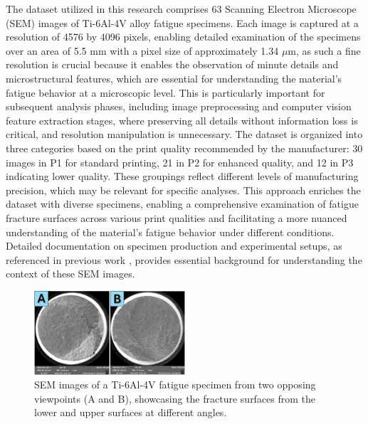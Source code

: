 \documentclass{ieeeaccess}
\begin{document}
The dataset utilized in this research comprises 63 Scanning Electron Microscope (SEM) images of Ti-6Al-4V alloy fatigue specimens. Each image is captured at a resolution of 4576 by 4096 pixels, enabling detailed examination of the specimens over an area of 5.5 mm with a pixel size of approximately 1.34 $\mu$m, as such a fine resolution is crucial because it enables the observation of minute details and microstructural features, which are essential for understanding the material’s fatigue behavior at a microscopic level.
This is particularly important for subsequent analysis phases, including image preprocessing and computer vision feature extraction stages, where preserving all details without information loss is critical, and resolution manipulation is unnecessary.
The dataset is organized into three categories based on the print quality recommended by the manufacturer: 30 images in P1 for standard printing, 21 in P2 for enhanced quality, and 12 in P3 indicating lower quality. These groupings reflect different levels of manufacturing precision, which may be relevant for specific analyses.
This approach enriches the dataset with diverse specimens, enabling a comprehensive examination of fatigue fracture surfaces across various print qualities and facilitating a more nuanced understanding of the material's fatigue behavior under different conditions.
Detailed documentation on specimen production and experimental setups, as referenced in previous work \cite{navickaite2022efficient}, provides essential background for understanding the context of these SEM images.


\begin{figure}[ht!]
  \centering
  \includegraphics[width=0.5\textwidth]{figures/side_by_side.png}
  \caption{SEM images of a Ti-6Al-4V fatigue specimen from two opposing viewpoints (A and B), showcasing the fracture surfaces from the lower and upper surfaces at different angles.}
  \label{same_material_from_both_sides}
\end{figure}
\end{document}
